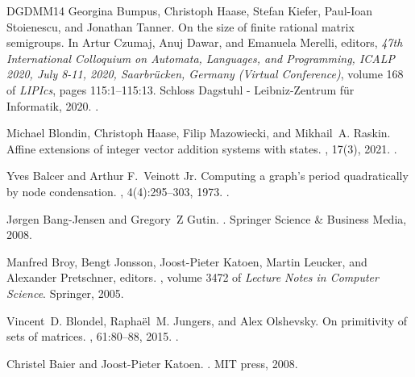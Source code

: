 \documentclass[11pt,a4paper]{amsart}
\theoremstyle{plain}
\theoremstyle{definition}
\theoremstyle{defC}
\theoremstyle{thmC}
\theoremstyle{plain}
\numberwithin{equation}{section}
\begin{document}
\begin{thebibliography}{DGDMM14}
Georgina Bumpus, Christoph Haase, Stefan Kiefer, Paul{-}Ioan Stoienescu, and
  Jonathan Tanner.
\newblock On the size of finite rational matrix semigroups.
\newblock In Artur Czumaj, Anuj Dawar, and Emanuela Merelli, editors, {\em 47th
  International Colloquium on Automata, Languages, and Programming, {ICALP}
  2020, July 8-11, 2020, Saarbr{\"{u}}cken, Germany (Virtual Conference)},
  volume 168 of {\em LIPIcs}, pages 115:1--115:13. Schloss Dagstuhl -
  Leibniz-Zentrum f{\"{u}}r Informatik, 2020.
\newblock \href {https://doi.org/10.4230/LIPICS.ICALP.2020.115}
  {}.

Michael Blondin, Christoph Haase, Filip Mazowiecki, and Mikhail~A. Raskin.
\newblock Affine extensions of integer vector addition systems with states.
, 17(3), 2021.
\newblock \href {https://doi.org/10.46298/LMCS-17(3:1)2021}
  {}.

Yves Balcer and Arthur F.~Veinott Jr.
\newblock Computing a graph's period quadratically by node condensation.
, 4(4):295--303, 1973.
\newblock \href {https://doi.org/10.1016/0012-365X(73)90166-0}
  {}.

J{\o}rgen Bang-Jensen and Gregory~Z Gutin.
.
\newblock Springer Science \& Business Media, 2008.

Manfred Broy, Bengt Jonsson, Joost{-}Pieter Katoen, Martin Leucker, and
  Alexander Pretschner, editors.
, volume 3472 of {\em Lecture Notes in Computer Science}.
  Springer, 2005.

Vincent~D. Blondel, Rapha{\"{e}}l~M. Jungers, and Alex Olshevsky.
\newblock On primitivity of sets of matrices.
, 61:80--88, 2015.
\newblock \href {https://doi.org/10.1016/J.AUTOMATICA.2015.07.026}
  {}.

Christel Baier and Joost-Pieter Katoen.
.
\newblock MIT press, 2008.


\end{thebibliography}
\end{document}
